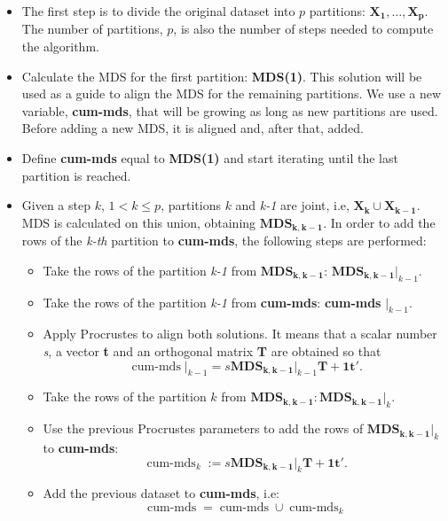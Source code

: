 \documentclass[11pt]{report}
\DeclareMathOperator{\cummds}{cum-mds}
\begin{document}
\begin{itemize}

\item The first step is to divide the original dataset into $p$ partitions: 
$\mathbf{X_1},\dots, \mathbf{X_p}$. The number of partitions, $p$, is also
the number of steps needed to compute the algorithm.

\item Calculate the MDS for the first partition: \textbf{MDS(1)}. This solution
will be used as a guide to align the MDS for the remaining partitions. We 
use a new variable, \textbf{cum-mds}, that will be growing as long as new 
partitions are used. Before adding a new MDS, it is aligned and, after 
that, added. 

\item Define \textbf{cum-mds} equal to \textbf{MDS(1)} and start iterating 
until the last partition is reached.

\item Given a step $k$, $1 < k \leq p$, partitions $k$ and \textit{k-1} are 
joint, i.e, $\mathbf{X_k} \cup \mathbf{X_{k-1}}$. MDS is calculated on 
this union, obtaining $\mathbf{MDS_{k, k-1}}$. In order to add the
rows of the \textit{k-th} partition to \textbf{cum-mds}, the following steps 
are performed:

\begin{itemize}
\item Take the rows of the partition \textit{k-1} from $\mathbf{MDS_{k, k-1}}$: 
$\mathbf{MDS_{k, k-1}} \Bigr|_{k-1}$.
\item Take the rows of the partition \textit{k-1} from \textbf{cum-mds}: 
\textbf{cum-mds} $\Bigr|_{k-1}$.
\item Apply Procrustes to align both solutions. It means that a scalar number
\textit{s}, a vector \textbf{t} and an orthogonal matrix \textbf{T} are obtained
so that
\[
\boldsymbol{\cummds} \Bigr|_{k-1} = s \mathbf{MDS_{k, k-1}} \Bigr|_{k-1} \mathbf{T} + \mathbf{1t}'.
\]
\item Take the rows of the partition $k$ from $\mathbf{MDS_{k, k-1}}: \mathbf{MDS_{k, k-1}} \Bigr|_{k}$.
\item Use the previous Procrustes parameters to add the rows of 
$\mathbf{MDS_{k, k-1}} \Bigr|_{k}$ to \textbf{cum-mds}:
\[
\boldsymbol{\cummds}_k := s \mathbf{\mathbf{MDS_{k, k-1}}} \Bigr|_{k} \mathbf{T} + \mathbf{1t}'.
\]
\item Add the previous dataset to \textbf{cum-mds}, i.e:
\[
\boldsymbol{\cummds} = \boldsymbol{\cummds} \cup \boldsymbol{{\cummds}}_k
\]

\end{itemize}
\end{itemize}
\end{document}
